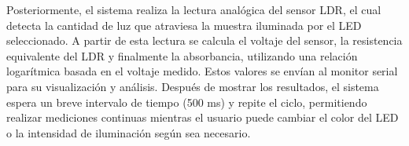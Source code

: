 Posteriormente, el sistema realiza la lectura analógica del sensor LDR, el cual detecta la cantidad de luz que atraviesa la muestra iluminada por el LED seleccionado. A partir de esta lectura se calcula el voltaje del sensor, la resistencia equivalente del LDR y finalmente la absorbancia, utilizando una relación logarítmica basada en el voltaje medido. Estos valores se envían al monitor serial para su visualización y análisis. Después de mostrar los resultados, el sistema espera un breve intervalo de tiempo (500 ms) y repite el ciclo, permitiendo realizar mediciones continuas mientras el usuario puede cambiar el color del LED o la intensidad de iluminación según sea necesario.



